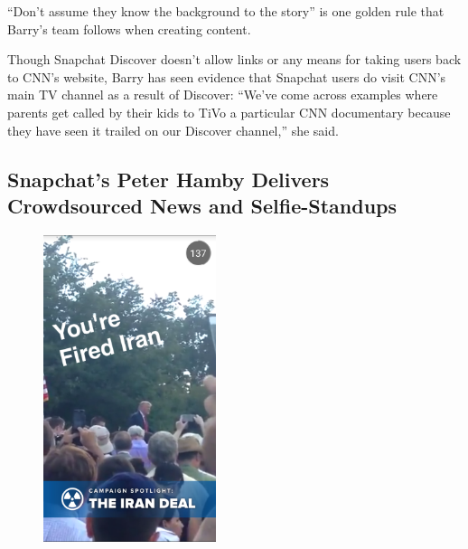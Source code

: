 \documentclass[notoc, symmetric, nobib, nols]{towcenter-guideto-book}
\begin{document}
``Don't assume they know the background to the story'' is one golden rule that Barry's team follows when creating content.




Though Snapchat Discover doesn't allow links or any means for taking users back to CNN's website, Barry has seen evidence that Snapchat users do visit CNN's main TV channel as a result of Discover: ``We've come across examples where parents get called by their kids to TiVo a particular CNN documentary because they have seen it trailed on our Discover channel,'' she said. 
\newpage
\subsection{Snapchat's Peter Hamby Delivers Crowdsourced News and Selfie-Standups}

\begin{figure}
\includegraphics[width=0.45\textwidth]{graphics/CHATAPPS_Page29_Iran2.png} 
\end{figure}
\end{document}
